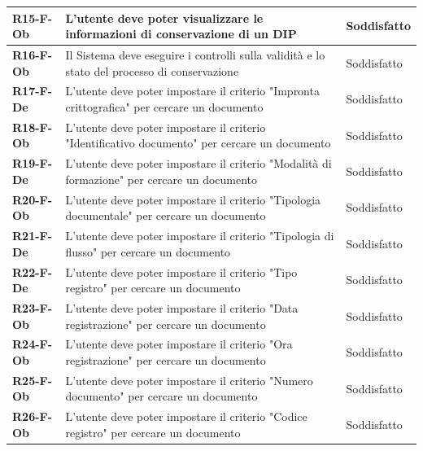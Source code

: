\documentclass[a4paper,12pt]{article}
\begin{document}
{{{\begin{longtable}{|>{\centering\arraybackslash}m{}|>{\centering\arraybackslash}m{}|>{\centering\arraybackslash}m{}|}
                \hline
                \textbf{R15-F-Ob} & L'utente deve poter visualizzare le informazioni di conservazione di un DIP & Soddisfatto \\ 
                \hline
                \textbf{R16-F-Ob} & Il Sistema deve eseguire i controlli sulla validità e lo stato del processo di conservazione & Soddisfatto \\ 
                \hline
                \textbf{R17-F-De} & L'utente deve poter impostare il criterio "Impronta crittografica" per cercare un documento & 
                Soddisfatto \\ 
                \hline
                \textbf{R18-F-Ob} & L'utente deve poter impostare il criterio "Identificativo documento" per cercare un documento & 
                Soddisfatto \\ 
                \hline
                \textbf{R19-F-De} & L'utente deve poter impostare il criterio "Modalità di formazione" per cercare un documento & 
                Soddisfatto \\ 
                \hline
                \textbf{R20-F-Ob} & L'utente deve poter impostare il criterio "Tipologia documentale" per cercare un documento & 
                Soddisfatto \\ 
                \hline
                \textbf{R21-F-De} & L'utente deve poter impostare il criterio "Tipologia di flusso" per cercare un documento & 
                Soddisfatto \\ 
                \hline
                \textbf{R22-F-De} & L'utente deve poter impostare il criterio "Tipo registro" per cercare un documento & 
                Soddisfatto \\
                \hline
                \textbf{R23-F-Ob} & L'utente deve poter impostare il criterio "Data registrazione" per cercare un documento & 
                Soddisfatto \\ 
                \hline
                \textbf{R24-F-Ob} & L'utente deve poter impostare il criterio "Ora registrazione" per cercare un documento & 
                Soddisfatto \\ 
                \hline
                \textbf{R25-F-Ob} & L'utente deve poter impostare il criterio "Numero documento" per cercare un documento & 
                Soddisfatto \\ 
                \hline
                \textbf{R26-F-Ob} & L'utente deve poter impostare il criterio "Codice registro" per cercare un documento & 
                Soddisfatto \\ 

\end{longtable}}}}
\end{document}
